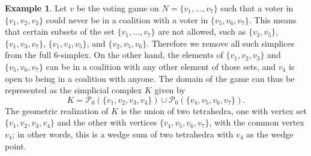 \documentclass[11pt]{amsart}
\newcommand{\ifn}[1]{\footnote{{\bf Ismar: }#1}} %
\theoremstyle{plain}
\theoremstyle{definition}
\newtheorem{example}[thm]{Example}
\theoremstyle{remark}
\begin{document}


\begin{example}
Let $v$ be the voting game on $N=\{v_1, ..., v_7\}$ such that a voter in $\{v_1, v_2, v_3\}$ could never be in a coalition with a voter in $\{v_5, v_6, v_7\}$. This means that certain subsets of the set $\{v_1,..., v_7\}$ are not allowed, such as $\{v_3, v_5\}$, $\{v_1, v_3, v_7\}$, $\{v_1, v_4, v_5\}$, and $\{v_2, v_5, v_6\}$. Therefore we remove all such simplices from the full $6$-simplex. On the other hand, the elements of $\{v_1, v_2, v_3\}$ and $\{v_5, v_6, v_7\}$ can be in a coalition with any other element of those sets, and $v_4$ is open to being in a coalition with anyone. The domain of the game can thus be represented as the simplicial complex $K$ given by
$$K=\mathcal{P}_0(\{v_1, v_2, v_3, v_4\})\cup \mathcal{P}_0(\{v_4, v_5, v_6, v_7\}).$$
The geometric realization of $K$ is the union of two tetrahedra, one with vertex set  $\{v_1, v_2, v_3, v_4\}$ and the other with vertices $\{v_4, v_5, v_6, v_7\}$, with the common vertex $v_4$; in other words, this is a wedge sum of two tetrahedra with $v_4$ as the wedge point.
\end{example}
\end{document}
